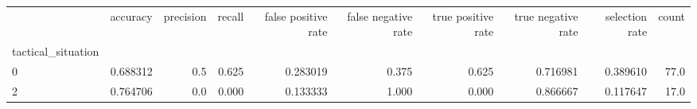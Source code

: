 \begin{tabular}{lrrrrrrrrr}
\toprule
{} &  accuracy &  precision &  recall &  false positive rate &  false negative rate &  true positive rate &  true negative rate &  selection rate &  count \\
tactical\_situation &           &            &         &                      &                      &                     &                     &                 &        \\
\midrule
0                  &  0.688312 &        0.5 &   0.625 &             0.283019 &                0.375 &               0.625 &            0.716981 &        0.389610 &   77.0 \\
2                  &  0.764706 &        0.0 &   0.000 &             0.133333 &                1.000 &               0.000 &            0.866667 &        0.117647 &   17.0 \\
\bottomrule
\end{tabular}
